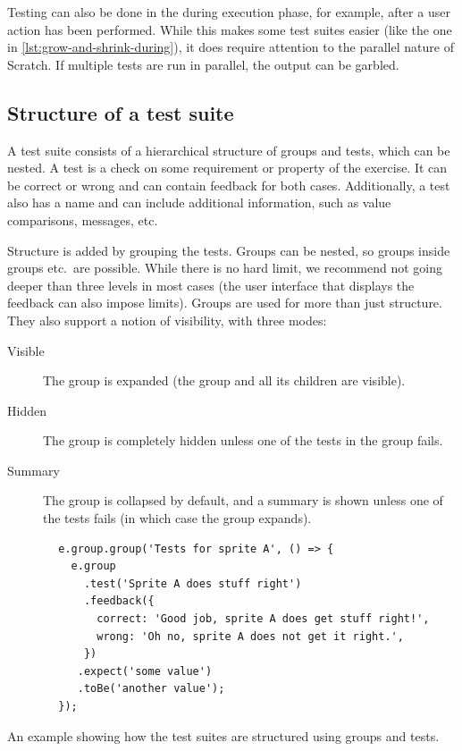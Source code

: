 \documentclass[../main]{subfiles}
\begin{document}
Testing can also be done in the during execution phase, for example, after a user action has been performed.
While this makes some test suites easier (like the one in \cref{lst:grow-and-shrink-during}), it does require attention to the parallel nature of Scratch.
If multiple tests are run in parallel, the output can be garbled.

\subsection{Structure of a test suite}\label{subsec:structure-of-a-test-suite2}

A test suite consists of a hierarchical structure of groups and tests, which can be nested.
A test is a check on some requirement or property of the exercise.
It can be correct or wrong and can contain feedback for both cases.
Additionally, a test also has a name and can include additional information, such as value comparisons, messages, etc.

Structure is added by grouping the tests.
Groups can be nested, so groups inside groups etc.\ are possible.
While there is no hard limit, we recommend not going deeper than three levels in most cases (the user interface that displays the feedback can also impose limits).
Groups are used for more than just structure.
They also support a notion of visibility, with three modes:

\begin{description}
    \item[Visible] The group is expanded (the group and all its children are visible).
    \item[Hidden] The group is completely hidden unless one of the tests in the group fails.
    \item[Summary] The group is collapsed by default, and a summary is shown unless one of the tests fails (in which case the group expands).
\end{description}

\begin{listing}
    \centering
    \begin{verbatim}
        e.group.group('Tests for sprite A', () => {
          e.group
            .test('Sprite A does stuff right')
            .feedback({
              correct: 'Good job, sprite A does get stuff right!',
              wrong: 'Oh no, sprite A does not get it right.',
            })
           .expect('some value')
           .toBe('another value');
        });
    \end{verbatim}
    \caption{An example showing how the test suites are structured using groups and tests.}\label{lst:itch-test-suite-structure}
\end{listing}
\end{document}
